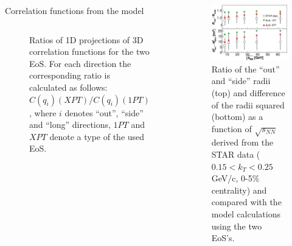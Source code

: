 \documentclass[final,hyperref={pdfpagelabels=false}, xcolor=dvipsnames]{beamer}
\begin{document}
\begin{frame}[shrink=30]
\begin{columns}[t]
\begin{block}{Correlation functions from the model}
\begin{columns}[t]
\begin{figure}[H]
          \caption{Ratios of 1D projections of 3D correlation functions for the two EoS. 
     For each direction the corresponding ratio is calculated as follows: $C(q_{i}) (XPT) / C(q_{i}) (1PT)$, 
     where $i$ denotes ``out'', ``side'' and ``long'' directions, $1PT$ and $XPT$ denote a type of the used EoS.}
      \end{figure}
    \end{columns} 
   \end{block}
   
   \begin{figure}[H]
      \includegraphics[width=1.\linewidth]{fig5_poster.eps}
      \caption{Ratio of the ``out'' and ``side'' radii (top) and difference of the radii squared (bottom) 
   as a function of $\sqrt{s_{NN}}$ derived from the STAR data ($0.15 < k_{T} < 0.25$ GeV/c, 0-5\% centrality) 
   and compared with the model calculations using the two EoS's.}
   \end{figure}
 


\end{columns}
\end{frame}
\end{document}
